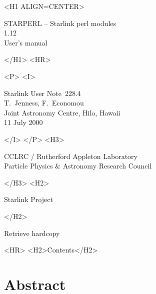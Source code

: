 \documentclass[twoside,11pt]{article}
\newcommand{\stardoccategory}  {Starlink User Note}
\newcommand{\stardocsource}    {sun\stardocnumber}
\newcommand{\stardocnumber}    {228.4}
\newcommand{\stardocauthors}   {T.\ Jenness, F.\ Economou\\
                                Joint Astronomy Centre, Hilo, Hawaii}
\newcommand{\stardocdate}      {11 July 2000}
\newcommand{\stardoctitle}     {STARPERL -- Starlink perl modules}
\newcommand{\stardocversion}   {1.12}
\newcommand{\stardocmanual}    {User's manual}
\newcommand{\htmladdnormallink}[2]{#1}
\newcommand{\htmladdimg}[1]{}
\newcommand{\htmlref}[2]{#1}
\newcommand{\htmladdtonavigation}[1]{}
\newcommand{\xlabel}[1]{}
\renewcommand{\_}{\texttt{\symbol{95}}}
\begin{document}
\begin{htmlonly}
   \xlabel{}
   \begin{rawhtml} <H1 ALIGN=CENTER> \end{rawhtml}
      \stardoctitle\\
      \stardocversion\\
      \stardocmanual
   \begin{rawhtml} </H1> <HR> \end{rawhtml}


   \begin{rawhtml} <P> <I> \end{rawhtml}
   \stardoccategory\ \stardocnumber \\
   \stardocauthors \\
   \stardocdate
   \begin{rawhtml} </I> </P> <H3> \end{rawhtml}
      \htmladdnormallink{CCLRC}{http://www.cclrc.ac.uk} /
      \htmladdnormallink{Rutherford Appleton Laboratory}
                        {http://www.cclrc.ac.uk/ral} \\
      \htmladdnormallink{Particle Physics \& Astronomy Research Council}
                        {http://www.pparc.ac.uk} \\
   \begin{rawhtml} </H3> <H2> \end{rawhtml}
      \htmladdnormallink{Starlink Project}{http://star-www.rl.ac.uk/}
   \begin{rawhtml} </H2> \end{rawhtml}
   \htmladdnormallink{\htmladdimg{source.gif} Retrieve hardcopy}
      {http://star-www.rl.ac.uk/cgi-bin/hcserver?\stardocsource}\\

  \label{stardoccontents}
  \begin{rawhtml} 
    <HR>
    <H2>Contents</H2>
  \end{rawhtml}
  \htmladdtonavigation{\htmlref{\htmladdimg{contents_motif.gif}}
        {stardoccontents}}

  \section{\xlabel{abstract}Abstract}
\end{htmlonly}
\end{document}
